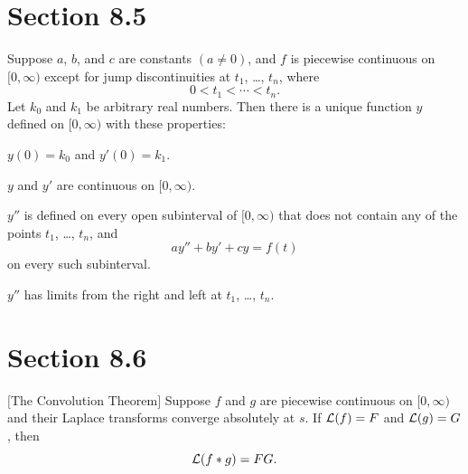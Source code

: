 \section*{Section 8.5}
\setcounter{chapter}{8}
\setcounter{section}{5}

\setcounter{theorem}{0}
\begin{theorem}
  \label{thmtype:8.5.1} Suppose $a$, $b$, and $c$ are constants $(a\ne0)$, and $f$ is piecewise
  continuous on $[0,\infty)$ except for jump discontinuities at $t_{1}$, \dots, $t_{n}$, where
  \[
    0<t_{1}<\cdots<t_{n}.
  \]
  Let $k_{0}$ and $k_{1}$ be arbitrary real numbers. Then there is a unique function $y$ defined on
  $[0,\infty)$ with these properties:
  \begin{alist}
    \item %
    $y(0)=k_{0}$ and $y'(0)=k_{1}$.

    \item %
    $y$ and $y'$ are continuous on $[0,\infty)$.

    \item %
    $y''$ is defined on every open subinterval of $[0,\infty)$ that does not contain any of the
    points $t_{1}$, \dots, $t_{n}$, and
    \[
      ay''+by'+cy=f(t)
    \]
    on every such subinterval.

    \item %
    $y''$ has limits from the right and left at $t_{1}$, \dots, $t_{n}$.
  \end{alist}
\end{theorem}

\section*{Section 8.6}
\setcounter{chapter}{8}
\setcounter{section}{6}

\setcounter{theorem}{1}
\begin{theorem}
  $[$The Convolution Theorem$]$\label{thmtype:8.6.2} Suppose $f$ and $g$ are piecewise continuous on $[0,\infty)$ and their Laplace transforms converge absolutely at $s$. If ${\cal L}(f)=F$ and ${\cal L}(g)=G$, then
  \[
    {\cal L}(f*g)=FG.
  \]
\end{theorem}

